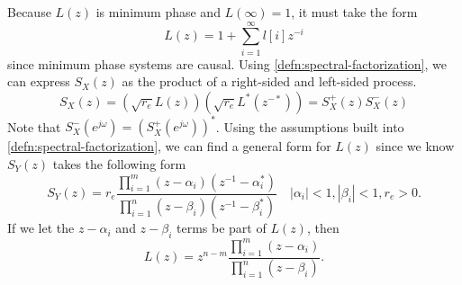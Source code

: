 Because $L(z)$ is minimum phase and $L(\infty)=1$, it must take the form \[
	L(z) = 1 + \sum_{i=1}^\infty l[i]z^{-i}
\] since minimum phase systems are causal.
Using \cref{defn:spectral-factorization}, we can express $S_X(z)$ as the product of a right-sided and left-sided process.
\[
	S_X(z) = (\sqrt{r_e}L(z))(\sqrt{r_e}L^*(z^{-*})) = S_X^+(z)S_X^-(z)
\]
Note that $S_X^-(e^{j\omega}) = \left(S_X^+(e^{j\omega})\right)^*$.
Using the assumptions built into \cref{defn:spectral-factorization}, we can find a general form for $L(z)$ since we know $S_Y(z)$ takes the following form
\[
	S_Y(z) = r_e \frac{\prod_{i=1}^m(z-\alpha_i)(z^{-1}-\alpha_i^*)}{\prod_{i=1}^n(z-\beta_i)(z^{-1}-\beta_i^*)}\quad |\alpha_i| < 1, |\beta_i| < 1, r_e > 0.
\]
If we let the $z - \alpha_i$ and $z-\beta_i$ terms be part of $L(z)$, then
\[
	L(z) = z^{n-m}\frac{\prod_{i=1}^m(z-\alpha_i)}{\prod_{i=1}^n(z-\beta_i)}.
\]
